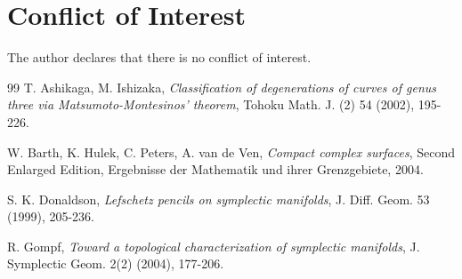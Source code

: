 \documentclass[10pt,a4paper,reqno]{amsart}
\theoremstyle{definition}
\numberwithin{equation}{section}
\numberwithin{figure}{section}
\begin{document}
\section*{Conflict of Interest}
The author declares that there is no conflict of interest.




\begin{thebibliography}{99}
 T. Ashikaga, M. Ishizaka,
	{\em Classification of degenerations of curves of genus three via Matsumoto-Montesinos' theorem},
	Tohoku Math. J. (2) 54 (2002), 195-226.

 W. Barth, K. Hulek, C. Peters, A. van de Ven,
	{\em Compact complex surfaces},
	Second Enlarged Edition, Ergebnisse der Mathematik und ihrer Grenzgebiete, 2004.


	
 S. K. Donaldson,
	{\em Lefschetz pencils on symplectic manifolds},
	J. Diff. Geom. 53 (1999), 205-236.

	
	
	
 R. Gompf,
	{\em Toward a topological characterization of symplectic manifolds},
	J. Symplectic Geom. 2(2) (2004), 177-206.
	

		

\end{thebibliography}
\end{document}
